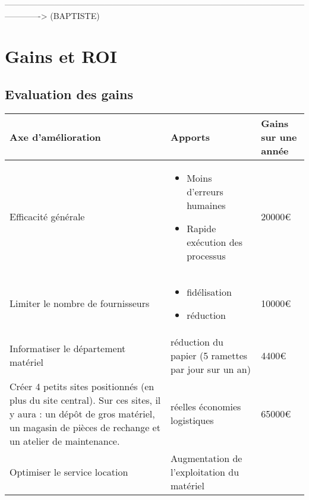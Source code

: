 \begin{description}
-------------------------------------------------------------------------------------------------------------------------> (BAPTISTE)

\section{Gains et ROI}
\subsection{Evaluation des gains}

    \begin{tabular}{|p{7cm}|p{5cm}|p{2cm}|}    \hline
Axe d'amélioration & Apports & Gains sur une année\\ \hline

Efficacité générale
                                  & \begin{itemize}
                                      \item Moins d'erreurs humaines
                                      \item Rapide exécution des processus
                                     \end{itemize}
                                                          & 20000€  \\ \cline{1-2}
Limiter le nombre de fournisseurs 
                                  & \begin{itemize}
                                      \item fidélisation
                                      \item réduction
                                     \end{itemize}
                                                          & 10000€  \\ \cline{1-2}
Informatiser le département matériel 
                                  & réduction du papier (5 ramettes par jour sur un an)
                                                          & 4400€  \\ \cline{1-2}
Créer 4 petits sites positionnés (en plus du site central). Sur ces sites, il y aura : un dépôt de gros matériel, un magasin de
pièces de rechange et un atelier de maintenance. 
                                  & réelles économies logistiques
                                                          & 65000€  \\ \cline{1-2}
Optimiser le service location 
                                  & Augmentation de l'exploitation du matériel

\end{tabular}
\end{description}
